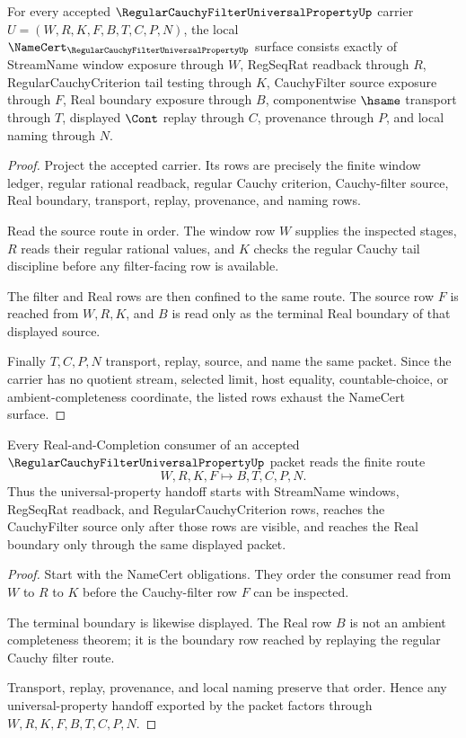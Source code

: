 \begin{theorem}
\label{thm:regular-cauchy-filter-universal-property-obligations}
For every accepted $\RegularCauchyFilterUniversalPropertyUp$ carrier $U=(W,R,K,F,B,T,C,P,N)$, the local $\NameCert_{\RegularCauchyFilterUniversalPropertyUp}$ surface consists exactly of StreamName window exposure through $W$, RegSeqRat readback through $R$, RegularCauchyCriterion tail testing through $K$, CauchyFilter source exposure through $F$, Real boundary exposure through $B$, componentwise $\hsame$ transport through $T$, displayed $\Cont$ replay through $C$, provenance through $P$, and local naming through $N$.
\end{theorem}
\begin{proof}
Project the accepted carrier. Its rows are precisely the finite window ledger, regular rational readback, regular Cauchy criterion, Cauchy-filter source, Real boundary, transport, replay, provenance, and naming rows.

Read the source route in order. The window row $W$ supplies the inspected stages, $R$ reads their regular rational values, and $K$ checks the regular Cauchy tail discipline before any filter-facing row is available.

The filter and Real rows are then confined to the same route. The source row $F$ is reached from $W,R,K$, and $B$ is read only as the terminal Real boundary of that displayed source.

Finally $T,C,P,N$ transport, replay, source, and name the same packet. Since the carrier has no quotient stream, selected limit, host equality, countable-choice, or ambient-completeness coordinate, the listed rows exhaust the NameCert surface.
\end{proof}

\begin{theorem}
\label{thm:regular-cauchy-filter-universal-property-route}
Every Real-and-Completion consumer of an accepted $\RegularCauchyFilterUniversalPropertyUp$ packet reads the finite route
$$
W,R,K,F \longmapsto B,T,C,P,N .
$$
Thus the universal-property handoff starts with StreamName windows, RegSeqRat readback, and RegularCauchyCriterion rows, reaches the CauchyFilter source only after those rows are visible, and reaches the Real boundary only through the same displayed packet.
\end{theorem}
\begin{proof}
Start with the NameCert obligations. They order the consumer read from $W$ to $R$ to $K$ before the Cauchy-filter row $F$ can be inspected.

The terminal boundary is likewise displayed. The Real row $B$ is not an ambient completeness theorem; it is the boundary row reached by replaying the regular Cauchy filter route.

Transport, replay, provenance, and local naming preserve that order. Hence any universal-property handoff exported by the packet factors through $W,R,K,F,B,T,C,P,N$.
\end{proof}

